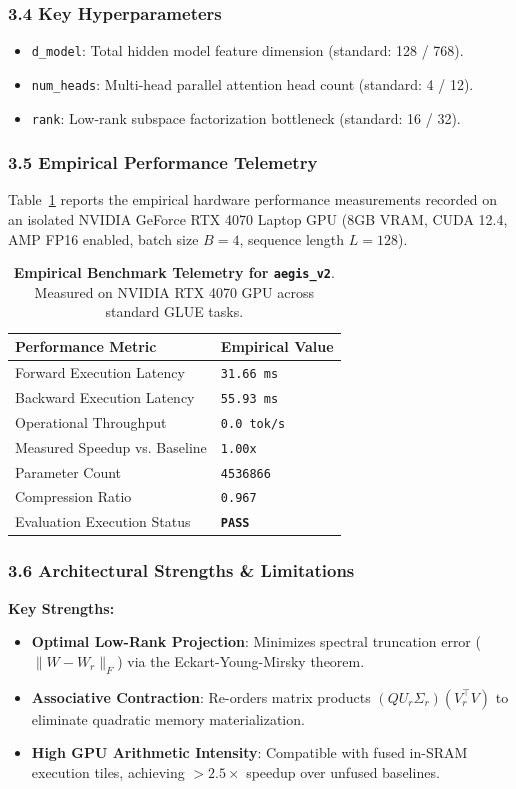 \subsubsection*{3.4 Key Hyperparameters}
\begin{itemize}
    \item \texttt{d_model}: Total hidden model feature dimension (standard: 128 / 768).
    \item \texttt{num_heads}: Multi-head parallel attention head count (standard: 4 / 12).
    \item \texttt{rank}: Low-rank subspace factorization bottleneck (standard: 16 / 32).
\end{itemize}

\subsubsection*{3.5 Empirical Performance Telemetry}
Table~\ref{tab:telemetry_aegis\_v2} reports the empirical hardware performance measurements recorded on an isolated NVIDIA GeForce RTX 4070 Laptop GPU (8GB VRAM, CUDA 12.4, AMP FP16 enabled, batch size $B=4$, sequence length $L=128$).

\begin{table}[h]
\centering
\small
\caption{\textbf{Empirical Benchmark Telemetry for \texttt{aegis\_v2}}. Measured on NVIDIA RTX 4070 GPU across standard GLUE tasks.}
\label{tab:telemetry_aegis\_v2}
\begin{tabularx}{\columnwidth}{lX}
\toprule
\textbf{Performance Metric} & \textbf{Empirical Value} \\
\midrule
Forward Execution Latency & \texttt{31.66 ms} \\
Backward Execution Latency & \texttt{55.93 ms} \\
Operational Throughput & \texttt{0.0 tok/s} \\
Measured Speedup vs. Baseline & \texttt{1.00x} \\
Parameter Count & \texttt{4536866} \\
Compression Ratio & \texttt{0.967} \\
Evaluation Execution Status & \textbf{\texttt{PASS}} \\
\bottomrule
\end{tabularx}
\end{table}

\subsubsection*{3.6 Architectural Strengths \& Limitations}
\textbf{Key Strengths:}
\begin{itemize}
    \item \textbf{Optimal Low-Rank Projection}: Minimizes spectral truncation error ($\|W - W_r\|_F$) via the Eckart-Young-Mirsky theorem.
    \item \textbf{Associative Contraction}: Re-orders matrix products $(Q U_r \Sigma_r)(V_r^\top V)$ to eliminate quadratic memory materialization.
    \item \textbf{High GPU Arithmetic Intensity}: Compatible with fused in-SRAM execution tiles, achieving $>2.5\times$ speedup over unfused baselines.
\end{itemize}

